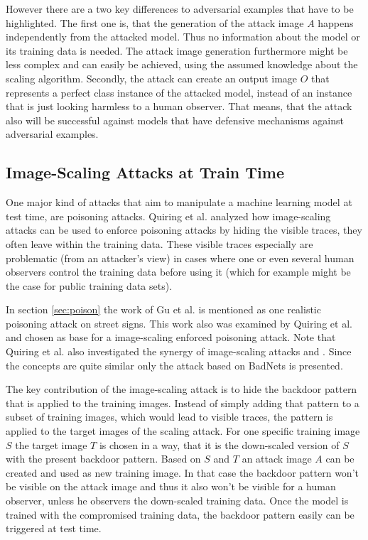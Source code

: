 \documentclass[sigconf]{acmart}
\begin{document}
However there are a two key differences to adversarial examples that have to be highlighted.
The first one is, that the generation of the attack image $A$ happens independently from the attacked model.
Thus no information about the model or its training data is needed.
The attack image generation furthermore might be less complex and can easily be achieved, using the assumed knowledge about the scaling algorithm.
Secondly, the attack can create an output image $O$ that represents a perfect class instance of the attacked model, instead of an instance that is just looking harmless to a human observer.
That means, that the attack also will be successful against models that have defensive mechanisms against adversarial examples.

\subsection{Image-Scaling Attacks at Train Time}
\label{sec:traintimeatt}

One major kind of attacks that aim to manipulate a machine learning model at test time, are poisoning attacks.
Quiring et al.\cite{imgscalepoison} analyzed how image-scaling attacks can be used to enforce poisoning attacks by hiding the visible traces, they often leave within the training data.
These visible traces especially are problematic (from an attacker's view) in cases where one or even several human observers control the training data before using it (which for example might be the case for public training data sets).

In section \ref{sec:poison} the work of Gu et al.\cite{8685687} is mentioned as one realistic poisoning attack on street signs.
This work also was examined by Quiring et al. and chosen as base for a image-scaling enforced poisoning attack.
Note that Quiring et al. also investigated the synergy of image-scaling attacks and \cite{trojanattack}.
Since the concepts are quite similar only the attack based on BadNets is presented.

The key contribution of the image-scaling attack is to hide the backdoor pattern that is applied to the training images.
Instead of simply adding that pattern to a subset of training images, which would lead to visible traces, the pattern is applied to the target images of the scaling attack.
For one specific training image $S$ the target image $T$ is chosen in a way, that it is the down-scaled version of $S$ with the present backdoor pattern.
Based on $S$ and $T$ an attack image $A$ can be created and used as new training image.
In that case the backdoor pattern won't be visible on the attack image and thus it also won't be visible for a human observer, unless he observers the down-scaled training data.
Once the model is trained with the compromised training data, the backdoor pattern easily can be triggered at test time.
\end{document}
